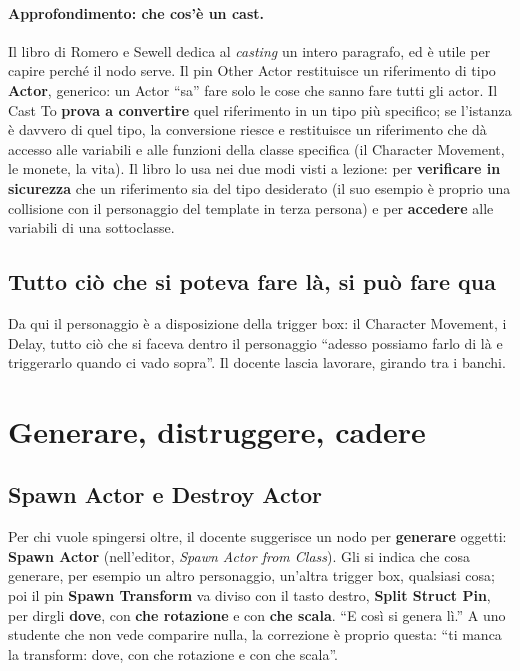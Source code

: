 \paragraph{Approfondimento: che cos'è un cast.} Il libro di Romero e Sewell
dedica al \emph{casting} un intero paragrafo, ed è utile per capire perché il
nodo serve. Il pin Other Actor restituisce un riferimento di tipo
\textbf{Actor}, generico: un Actor ``sa'' fare solo le cose che sanno fare
tutti gli actor. Il Cast To \textbf{prova a convertire} quel riferimento in un
tipo più specifico; se l'istanza è davvero di quel tipo, la conversione
riesce e restituisce un riferimento che dà accesso alle variabili e alle
funzioni della classe specifica (il Character Movement, le monete, la vita).
Il libro lo usa nei due modi visti a lezione: per \textbf{verificare in
sicurezza} che un riferimento sia del tipo desiderato (il suo esempio è
proprio una collisione con il personaggio del template in terza persona) e
per \textbf{accedere} alle variabili di una sottoclasse.

\subsection{Tutto ciò che si poteva fare là, si può fare qua}

Da qui il personaggio è a disposizione della trigger box: il Character
Movement, i Delay, tutto ciò che si faceva dentro il personaggio
``adesso possiamo farlo di là e triggerarlo quando ci vado sopra''. Il docente
lascia lavorare, girando tra i banchi.

\section{Generare, distruggere, cadere}
\label{gd7:sec:spawn}

\subsection{Spawn Actor e Destroy Actor}

Per chi vuole spingersi oltre, il docente suggerisce un nodo per
\textbf{generare} oggetti: \textbf{Spawn Actor} (nell'editor, \emph{Spawn
Actor from Class}). Gli si indica che cosa generare, per esempio un altro
personaggio, un'altra trigger box, qualsiasi cosa; poi il pin
\textbf{Spawn Transform} va diviso con il tasto destro, \textbf{Split Struct
Pin}, per dirgli \textbf{dove}, con \textbf{che rotazione} e con \textbf{che
scala}. ``E così si genera lì.'' A uno studente che non vede comparire nulla,
la correzione è proprio questa: ``ti manca la transform: dove, con che
rotazione e con che scala''.

